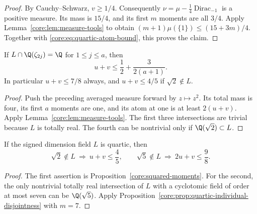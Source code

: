 \begin{proof}
By Cauchy--Schwarz, $v\ge1/4$.  Consequently
$\nu=\mu-\tfrac14\operatorname{Dirac}_{-1}$ is a positive measure.
Its mass is $15/4$, and its first $m$ moments are all $3/4$.
Apply Lemma~\ref{core:lem:measure-tools} to obtain
$(m+1)\mu(\{1\})\le(15+3m)/4$. Together with
\eqref{core:eq:quartic-atom-bound}, this proves the claim.
\end{proof}


\begin{proposition}\label{core:squared-moments}
If $L\cap\Q(\zeta_{2j})=\Q$ for $1\le j\le a$, then
\[
u+v\le\frac12+\frac{3}{2(a+1)}.
\]
In particular $u+v\le7/8$ always, and $u+v\le4/5$ if
$\sqrt2\notin L$.
\end{proposition}
\begin{proof}
Push the preceding averaged measure forward by $z\mapsto z^2$.
Its total mass is four, its first $a$ moments are one, and its atom
at one is at least $2(u+v)$. Apply Lemma~\ref{core:lem:measure-tools}. The first three
intersections are trivial because $L$ is totally real. The fourth
can be nontrivial only if $\Q(\sqrt2)\subset L$.
\end{proof}
\begin{corollary}\label{core:quartic-short-moments}
If the signed dimension field $L$ is quartic, then
\[
 \sqrt2\notin L\ \Longrightarrow\ u+v\le\frac45,
 \qquad
 \sqrt5\notin L\ \Longrightarrow\ 2u+v\le\frac98.
\]
\end{corollary}
\begin{proof}
The first assertion is Proposition~\ref{core:squared-moments}.
For the second, the only nontrivial totally real intersection of $L$
with a cyclotomic field of order at most seven can be
$\Q(\sqrt5)$. Apply
Proposition~\ref{core:prop:quartic-individual-disjointness} with $m=7$.
\end{proof}

